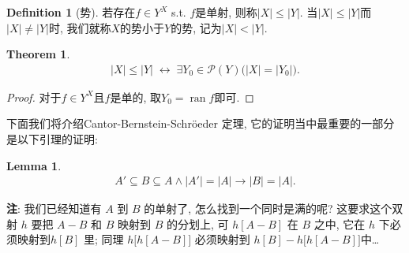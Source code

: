 \documentclass[openany]{ctexbook}
\theoremstyle{plain}
\newtheorem{theorem}{Theorem}[section] %
\newtheorem{lemma}{Lemma} %
\theoremstyle{definition}
\newtheorem{definition}{Definition}[section] %
\newcommand*{\IFF}{\;\leftrightarrow\;} %
\DeclareMathOperator{\ran}{ran}
\begin{document}
\begin{definition}[势]\label{definition: 势}
若存在$f \in Y^X$ s.t. $f$是单射, 则称$|X|\leq |Y|$. 
当$|X|\leq |Y|$而$|X|\neq |Y|$时, 我们就称$X$的势小于$Y$的势, 记为$|X| < |Y|$.
\end{definition}

\begin{theorem}
\begin{align*}
	|X| \leq |Y| 
		\IFF \exists Y_0\in \mathscr P(Y) \big(|X| = |Y_0| \big).
\end{align*}
\end{theorem}
\begin{proof}
对于$f\in Y^X$且$f$是单的, 取$Y_0 = \ran f$即可.
\end{proof}

下面我们将介绍Cantor-Bernstein-Schr\"oeder 定理, 它的证明当中最重要的一部分是以下引理的证明:
\begin{lemma}\label{lemma: CBS}
\begin{align*}
	A'\subseteq B \subseteq A \wedge |A'|=|A| 
		\to |B|=|A|.
\end{align*}
\end{lemma}
\textbf{注}: 我们已经知道有 $A$ 到 $B$ 的单射了, 怎么找到一个同时是满的呢? 
这要求这个双射 $h$ 要把 $A-B$ 和 $B$ 映射到 $B$ 的分划上, 可 $h[A-B]$ 在 $B$ 之中, 它在 $h$ 下必须映射到$h[B]$ 里; 
同理 $h\big\lbrack h[A-B] \big\rbrack$ 必须映射到 $h[B] - h \big\lbrack h[A-B]\big\rbrack$中\ldots
\end{document}
